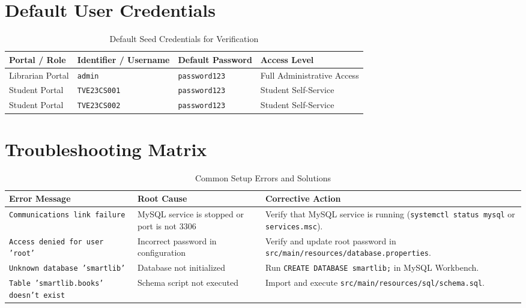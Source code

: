\section{Default User Credentials}
\begin{table}[h!]
    \centering
    \small
    \caption{Default Seed Credentials for Verification}
    \begin{tabularx}{\textwidth}{>{\raggedright\arraybackslash}p{3.2cm} >{\raggedright\arraybackslash}p{3.5cm} >{\raggedright\arraybackslash}p{3.2cm} >{\raggedright\arraybackslash}X}
        \toprule
        \textbf{Portal / Role} & \textbf{Identifier / Username} & \textbf{Default Password} & \textbf{Access Level} \\
        \midrule
        Librarian Portal & \texttt{admin} & \texttt{password123} & Full Administrative Access \\
        Student Portal & \texttt{TVE23CS001} & \texttt{password123} & Student Self-Service \\
        Student Portal & \texttt{TVE23CS002} & \texttt{password123} & Student Self-Service \\
        \bottomrule
    \end{tabularx}
    \label{tab:seed_creds}
\end{table}

\section{Troubleshooting Matrix}
\begin{table}[h!]
    \centering
    \small
    \caption{Common Setup Errors and Solutions}
    \begin{tabularx}{\textwidth}{>{\raggedright\arraybackslash}p{4.2cm} >{\raggedright\arraybackslash}p{4.0cm} >{\raggedright\arraybackslash}X}
        \toprule
        \textbf{Error Message} & \textbf{Root Cause} & \textbf{Corrective Action} \\
        \midrule
        \texttt{Communications link failure} & MySQL service is stopped or port is not 3306 & Verify that MySQL service is running (\texttt{systemctl status mysql} or \texttt{services.msc}). \\
        \midrule
        \texttt{Access denied for user 'root'} & Incorrect password in configuration & Verify and update root password in \texttt{src/main/}\allowbreak\texttt{resources/}\allowbreak\texttt{database.properties}. \\
        \midrule
        \texttt{Unknown database 'smartlib'} & Database not initialized & Run \texttt{CREATE DATABASE smartlib;} in MySQL Workbench. \\
        \midrule
        \texttt{Table 'smartlib.books' doesn't exist} & Schema script not executed & Import and execute \texttt{src/main/}\allowbreak\texttt{resources/sql/}\allowbreak\texttt{schema.sql}. \\
        \bottomrule
    \end{tabularx}
    \label{tab:troubleshooting}
\end{table}

